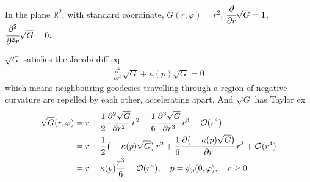 \documentclass[10pt]{article}
\begin{document}
            \begin{example}
                In the plane $\mathbb{R}^2$, with standard coordinate, $G(r,\varphi) = r^2$,  $\cfrac{\partial}{\partial r}\sqrt{G} = 1$, $\cfrac{\partial^2}{\partial^2 r}\sqrt{G} = 0$.
            \end{example}
            

            \begin{theorem}
                $\sqrt{G}$ satisfies the Jacobi diff eq
                \begin{equation*}
                    \begin{aligned}
                        \frac{\partial^2}{\partial r^2}\sqrt{G} + \kappa(p)\sqrt{G} = 0
                    \end{aligned}
                \end{equation*}
                which means neighbouring geodesics travelling through a region of negative curvature are repelled by each other, accelerating apart. And $\sqrt{G}$ has Taylor ex
                \begin{equation*}
                    \begin{aligned}
                        \sqrt{G}(r,\varphi) &= r + \cfrac{1}{2}\thinspace\cfrac{\partial^2\sqrt{G}}{\partial r^2}\thinspace r^2 + \cfrac{1}{6}\thinspace\cfrac{\partial^3\sqrt{G}}{\partial r^3}\thinspace r^3 + \mathcal{O}(r^4) \\
                        &= r + \cfrac{1}{2}\thinspace\big(-\kappa(p)\sqrt{G}\big)\thinspace r^2 + \cfrac{1}{6}\thinspace\cfrac{\partial\big(-\kappa(p)\sqrt{G}\big)}{\partial r}\thinspace r^3 + \mathcal{O}(r^4) \\
                        &= r - \kappa(p)\frac{r^3}{6} + \mathcal{O}(r^4),\quad p = \phi_p(0,\varphi),\quad r\ge 0
                    \end{aligned}
                \end{equation*}
            \end{theorem}
\end{document}
